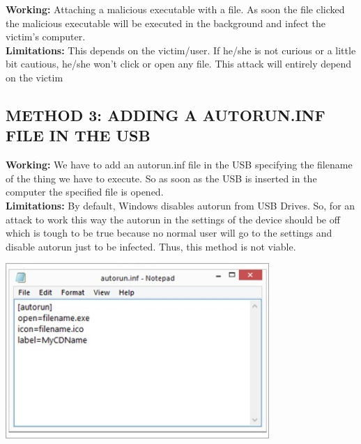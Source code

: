 \documentclass[11pt]{report}
\begin{document}
\textbf{Working:} Attaching a malicious executable with a file. As soon the
file clicked the malicious executable will be executed in the background and
infect the victim's computer. \\ [0.5em]
\textbf{Limitations:} This depends on the victim/user. If he/she is not curious
or a little bit cautious, he/she won't click or open any file. This attack will
entirely depend on the victim

\subsection*{METHOD 3: ADDING A AUTORUN.INF FILE IN THE USB}

\textbf{Working:} We have to add an autorun.inf file in the USB specifying the
filename of the thing we have to execute. So as soon as the USB is inserted in
the computer the specified file is opened.\\[0.5em]
\textbf{Limitations:} By default, Windows disables autorun from USB Drives. So,
for an attack to work this way the autorun in the settings of the device should
be off which is tough to be true because no normal user will go to the settings
and disable autorun just to be infected. Thus, this method is not viable.

\includegraphics[width=10cm]{Figures/Autorun.jpg}
\end{document}
